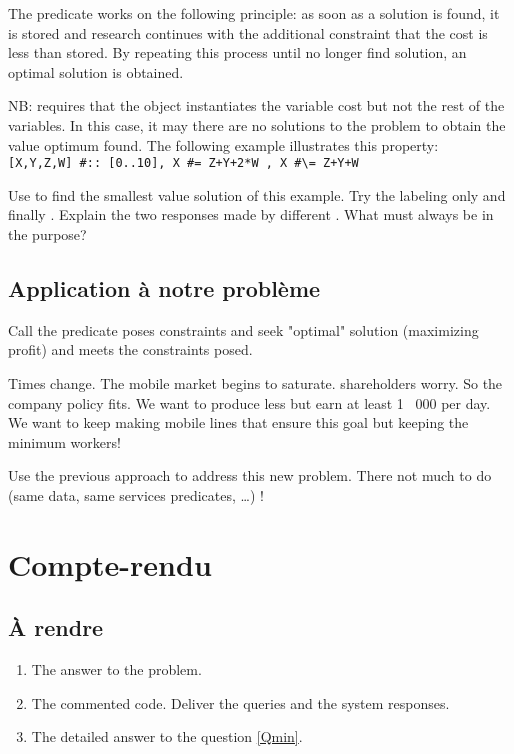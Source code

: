 The predicate  works on the following principle:
as soon as a solution is found, it is stored and research
continues with the additional constraint that the cost is less
than stored. By repeating this process until no longer find
solution, an optimal solution is obtained.

NB:  requires that the object instantiates the variable
cost but not the rest of the variables. In this case, it may
there are no solutions to the problem to obtain the value
optimum found. The following example illustrates this property:
\\\verb|[X,Y,Z,W] #:: [0..10], X #= Z+Y+2*W , X #\= Z+Y+W|

\begin{question}\label{Qmin}
  Use  to find the smallest value
    solution of this example. Try the labeling only
    and finally \code{[X, Y, Z, W]}. Explain the two responses
   made by different \eclipse{}. What must always be in
   the purpose?
\end{question}

\subsection{Application à notre problème}

\begin{question}
Call the predicate poses constraints and seek
   "optimal" solution (maximizing profit) and meets the
   constraints posed.
\end{question}

Times change. The mobile market begins to saturate. shareholders
worry. So the company policy fits. We want to produce
less but earn at least 1 \, 000 per day. We want to keep making
mobile lines that ensure this goal but keeping the minimum
workers!

\begin{question} \label{TPCPC_Qfin}
Use the previous approach to address this new problem. There
not much to do (same data, same services predicates, \dots) !
\end{question}

\section{Compte-rendu}

\subsection{À rendre}

\begin{enumerate}
\item The answer to the problem.
\item The commented code. Deliver the queries \eclipse{} and
  the system responses.
\item The detailed answer to the question \ref{Qmin}.
\end{enumerate}

